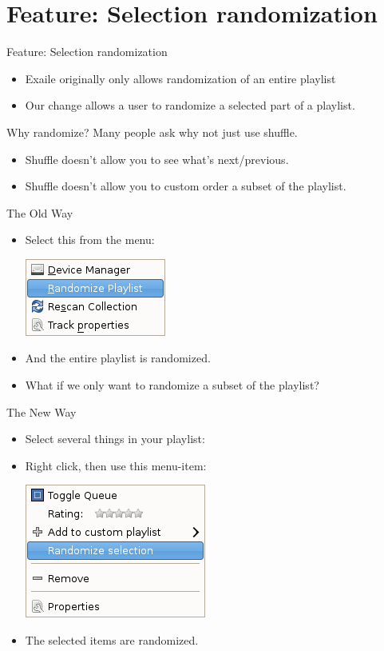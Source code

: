 \documentclass{beamer}
\begin{document}
\section{Feature: Selection randomization}

\begin{frame}{Feature: Selection randomization}
  \begin{itemize}
     \item Exaile originally only allows randomization of an entire playlist
     \item Our change allows a user to randomize a selected part of a playlist.
  \end{itemize}
\end{frame}

\begin{frame}{Why randomize?}
  Many people ask why not just use shuffle.
  \begin{itemize}
    \item Shuffle doesn't allow you to see what's next/previous.
	\item Shuffle doesn't allow you to custom order a subset of the playlist.
  \end{itemize}
\end{frame}

\begin{frame}{The Old Way}
  \begin{itemize}
    \item Select this from the menu:

    \includegraphics[keepaspectratio]{images/tools-menu}
    \item And the entire playlist is randomized.
	\item What if we only want to randomize a subset of the playlist?
  \end{itemize}
\end{frame}

\begin{frame}{The New Way}
  \begin{itemize}
  \item Select several things in your playlist:
  \item Right click, then use this menu-item:

    \includegraphics[keepaspectratio]{images/randomize-menu-item}
  \item The selected items are randomized.
  \end{itemize}
\end{frame}
\end{document}
